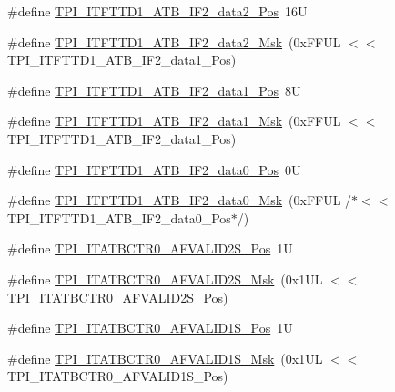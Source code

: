 \begin{DoxyCompactItemize}
\item 
\#define \mbox{\hyperlink{group___c_m_s_i_s___t_p_i_ga795919f12700ccafc14122cf023f8ff3}{T\+P\+I\+\_\+\+I\+T\+F\+T\+T\+D1\+\_\+\+A\+T\+B\+\_\+\+I\+F2\+\_\+data2\+\_\+\+Pos}}~16U
\item 
\#define \mbox{\hyperlink{group___c_m_s_i_s___t_p_i_ga284ac1fccc1eed973d38ddba209ee04a}{T\+P\+I\+\_\+\+I\+T\+F\+T\+T\+D1\+\_\+\+A\+T\+B\+\_\+\+I\+F2\+\_\+data2\+\_\+\+Msk}}~(0x\+F\+F\+U\+L $<$$<$ T\+P\+I\+\_\+\+I\+T\+F\+T\+T\+D1\+\_\+\+A\+T\+B\+\_\+\+I\+F2\+\_\+data1\+\_\+\+Pos)
\item 
\#define \mbox{\hyperlink{group___c_m_s_i_s___t_p_i_ga1a6cd0ad1a353a2f59ad86f7a3506d67}{T\+P\+I\+\_\+\+I\+T\+F\+T\+T\+D1\+\_\+\+A\+T\+B\+\_\+\+I\+F2\+\_\+data1\+\_\+\+Pos}}~8U
\item 
\#define \mbox{\hyperlink{group___c_m_s_i_s___t_p_i_gad02cfa7d9eb9927a4fd6beece42cf159}{T\+P\+I\+\_\+\+I\+T\+F\+T\+T\+D1\+\_\+\+A\+T\+B\+\_\+\+I\+F2\+\_\+data1\+\_\+\+Msk}}~(0x\+F\+F\+U\+L $<$$<$ T\+P\+I\+\_\+\+I\+T\+F\+T\+T\+D1\+\_\+\+A\+T\+B\+\_\+\+I\+F2\+\_\+data1\+\_\+\+Pos)
\item 
\#define \mbox{\hyperlink{group___c_m_s_i_s___t_p_i_gaaa0d7dc480efe4e717e2ab84643ae6e0}{T\+P\+I\+\_\+\+I\+T\+F\+T\+T\+D1\+\_\+\+A\+T\+B\+\_\+\+I\+F2\+\_\+data0\+\_\+\+Pos}}~0U
\item 
\#define \mbox{\hyperlink{group___c_m_s_i_s___t_p_i_gaf688adf6b3790de906b3f50bc89eaaed}{T\+P\+I\+\_\+\+I\+T\+F\+T\+T\+D1\+\_\+\+A\+T\+B\+\_\+\+I\+F2\+\_\+data0\+\_\+\+Msk}}~(0x\+F\+F\+U\+L /$\ast$$<$$<$ T\+P\+I\+\_\+\+I\+T\+F\+T\+T\+D1\+\_\+\+A\+T\+B\+\_\+\+I\+F2\+\_\+data0\+\_\+\+Pos$\ast$/)
\item 
\#define \mbox{\hyperlink{group___c_m_s_i_s___t_p_i_ga1ca17a69fe70e2cb87f04a2160bca51a}{T\+P\+I\+\_\+\+I\+T\+A\+T\+B\+C\+T\+R0\+\_\+\+A\+F\+V\+A\+L\+I\+D2\+S\+\_\+\+Pos}}~1U
\item 
\#define \mbox{\hyperlink{group___c_m_s_i_s___t_p_i_ga8d47192a54ef5a7e9086d4c949f33b24}{T\+P\+I\+\_\+\+I\+T\+A\+T\+B\+C\+T\+R0\+\_\+\+A\+F\+V\+A\+L\+I\+D2\+S\+\_\+\+Msk}}~(0x1\+U\+L $<$$<$ T\+P\+I\+\_\+\+I\+T\+A\+T\+B\+C\+T\+R0\+\_\+\+A\+F\+V\+A\+L\+I\+D2\+S\+\_\+\+Pos)
\item 
\#define \mbox{\hyperlink{group___c_m_s_i_s___t_p_i_gac2018f988c8306301a11a8f08af67d2c}{T\+P\+I\+\_\+\+I\+T\+A\+T\+B\+C\+T\+R0\+\_\+\+A\+F\+V\+A\+L\+I\+D1\+S\+\_\+\+Pos}}~1U
\item 
\#define \mbox{\hyperlink{group___c_m_s_i_s___t_p_i_ga8ea98aa5bb5a223e409213ef9a754cbd}{T\+P\+I\+\_\+\+I\+T\+A\+T\+B\+C\+T\+R0\+\_\+\+A\+F\+V\+A\+L\+I\+D1\+S\+\_\+\+Msk}}~(0x1\+U\+L $<$$<$ T\+P\+I\+\_\+\+I\+T\+A\+T\+B\+C\+T\+R0\+\_\+\+A\+F\+V\+A\+L\+I\+D1\+S\+\_\+\+Pos)

\end{DoxyCompactItemize}
